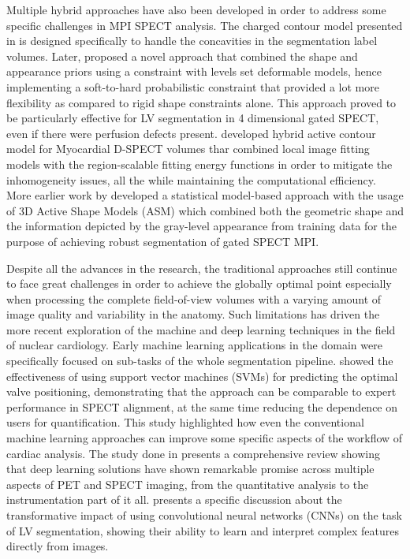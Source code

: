 Multiple hybrid approaches have also been developed in order to address some specific challenges in MPI SPECT analysis. The charged contour model presented in \cite{Yang2006ACC} is designed specifically to handle the concavities in the segmentation label volumes. Later, \cite{https://doi.org/10.1049/iet-cvi.2012.0081} proposed a novel approach that combined the shape and appearance priors using a constraint with levels set deformable models, hence implementing a soft-to-hard probabilistic constraint that provided a lot more flexibility as compared to rigid shape constraints alone. This approach proved to be particularly effective for LV segmentation in 4 dimensional gated SPECT, even if there were perfusion defects present. \cite{8409947} developed hybrid active contour model for Myocardial D-SPECT volumes thar combined local image fitting models with the region-scalable fitting energy functions in order to mitigate the inhomogeneity issues, all the while maintaining the computational efficiency. More earlier work by \cite{7123558} developed a statistical model-based approach with the usage of 3D Active Shape Models (ASM) which combined both the geometric shape and the information depicted by the gray-level appearance from training data for the purpose of achieving robust segmentation of gated SPECT MPI.

Despite all the advances in the research, the traditional approaches still continue to face great challenges in order to achieve the globally optimal point especially when processing the complete field-of-view volumes with a varying amount of image quality and variability in the anatomy. Such limitations has driven the more recent exploration of the machine and deep learning techniques in the field of nuclear cardiology. Early machine learning applications in the domain were specifically focused on sub-tasks of the whole segmentation pipeline. \cite{Betancur2017} showed the effectiveness of using support vector machines (SVMs) for predicting the optimal valve positioning, demonstrating that the approach can be comparable to expert performance in SPECT alignment, at the same time reducing the dependence on users for quantification. This study highlighted how even the conventional machine learning approaches can improve some specific aspects of the workflow of cardiac analysis. The study done in \cite{ARABI2021122} presents a comprehensive review showing that deep learning solutions have shown remarkable promise across multiple aspects of PET and SPECT imaging, from the quantitative analysis to the instrumentation part of it all. \cite{WOLTERINK2020988} presents a specific discussion about the transformative impact of using convolutional neural networks (CNNs) on the task of LV segmentation, showing their ability to learn and interpret complex features directly from images. 

